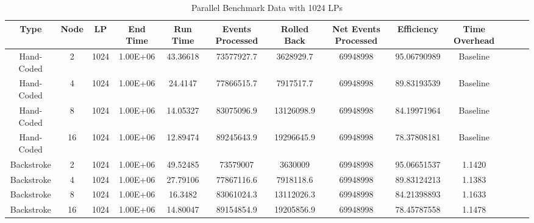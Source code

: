 \begin{table}
\begin{center}
\tiny\addtolength{\tabcolsep}{-5pt}
\caption{Parallel Benchmark Data with 1024 LPs}
\label{table:parallel_data_1024}
\begin{tabular}{|c|c|c|c|c|c|c|c|c|c|c|c|c|}\hline
Type & Node & LP & End Time & Run Time & Events Processed & Rolled Back & Net Events Processed & Efficiency & Time Overhead  \\\hline

Hand-Coded &    2 &     1024 &  1.00E+06 &      43.36618 &      73577927.7 &       3628929.7  & 69948998 & 95.06790989 &           Baseline \\\hline
Hand-Coded &    4 &     1024 &  1.00E+06 &      24.4147 &       77866515.7 &       7917517.7  & 69948998 & 89.83193539     &       Baseline \\\hline
Hand-Coded &    8 &     1024 &  1.00E+06 &      14.05327 &      83075096.9 &       13126098.9  & 69948998 &        84.19971964     &       Baseline \\\hline
Hand-Coded &    16 &    1024 &  1.00E+06 &      12.89474 &      89245643.9 & 19296645.9  & 69948998 &      78.37808181     &       Baseline \\\hline
                                                                                                
Backstroke &    2 &     1024 &  1.00E+06 &      49.52485  &     73579007 &               3630009                 & 69948998      & 95.06651537           & 1.1420 \\\hline
Backstroke &    4 &     1024 &  1.00E+06 &      27.79106 &      77867116.6 &       7918118.6               & 69948998      & 89.83124213           & 1.1383 \\\hline
Backstroke &    8 &     1024 &  1.00E+06 &      16.3482 &       83061024.3 &       13112026.3         & 69948998   & 84.21398893           & 1.1633 \\\hline
Backstroke &    16 & 1024 &     1.00E+06 &      14.80047 &      89154854.9 &       19205856.9      & 69948998      & 78.45787558           & 1.1478 \\\hline

\end{tabular}
\end{center}
\end{table}


